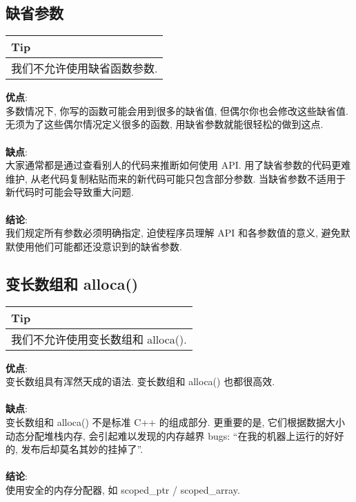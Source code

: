 \documentclass[a4paper,11pt,CJK]{article}
\begin{document}
\begin{CJK}{UTF8}{gbsn}
\subsection{缺省参数}
\begin{table}[htbp]
\flushleft
\begin{tabular}{p{400pt}}
\toprule
\rowcolor[gray]{.8} Tip \\
\midrule
我们不允许使用缺省函数参数.\\
\bottomrule
\end{tabular}
\end{table}
\noindent
\textbf{优点}:\\
\indent 多数情况下, 你写的函数可能会用到很多的缺省值, 但偶尔你也会修改这些缺省值. 无须为了这些偶尔情况定义很多的函数, 用缺省参数就能很轻松的做到这点.\\
\\
\textbf{缺点}:\\
\indent 大家通常都是通过查看别人的代码来推断如何使用 API. 用了缺省参数的代码更难维护, 从老代码复制粘贴而来的新代码可能只包含部分参数. 当缺省参数不适用于新代码时可能会导致重大问题.\\
\\
\textbf{结论}:\\
\indent 我们规定所有参数必须明确指定, 迫使程序员理解 API 和各参数值的意义, 避免默默使用他们可能都还没意识到的缺省参数.

\subsection{变长数组和 alloca()}
\begin{table}[htbp]
\flushleft
\begin{tabular}{p{400pt}}
\toprule
\rowcolor[gray]{.8} Tip \\
\midrule
我们不允许使用变长数组和 alloca().\\
\bottomrule
\end{tabular}
\end{table}
\noindent
\textbf{优点}:\\
\indent 变长数组具有浑然天成的语法. 变长数组和 alloca() 也都很高效.\\
\\
\textbf{缺点}:\\
\indent 变长数组和 alloca() 不是标准 C++ 的组成部分. 更重要的是, 它们根据数据大小动态分配堆栈内存, 会引起难以发现的内存越界 bugs: ``在我的机器上运行的好好的, 发布后却莫名其妙的挂掉了''.\\
\\
\textbf{结论}:\\
\indent 使用安全的内存分配器, 如 scoped\_ptr / scoped\_array.\\


\end{CJK}
\end{document}

